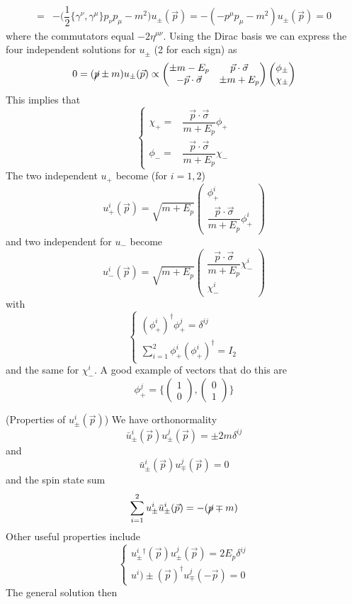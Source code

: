 \begin{defi}
\[\begin{align*}
=&-\Big(\dfrac{1}{2}\{\gamma ^{\nu },\gamma ^{\mu }\}p_{\nu }p_{\mu }-m^2\Big)u_{\pm}(\vec{p})=-(-p^{\mu }p_{\mu }-m^2)u_{\pm}(\vec{p})=0
\end{align*}\]
where the commutators equal $-2\eta ^{\mu \nu }$. Using the Dirac basis we can express the four independent solutions for $u_{\pm}$ (2 for each sign) as
\[0=(\cancel{p}\pm m)u_{\pm}(\vec{p})\propto \begin{pmatrix}
	\pm m-E_{p}&\vec{p}\cdot \vec{\sigma }\\
	-\vec{p}\cdot \vec{\sigma }&\pm m+E_{p}
\end{pmatrix}\begin{pmatrix}
\phi _{\pm}\\\chi _{\pm}
\end{pmatrix}

\]
This implies that
\[\begin{cases}
	\chi _{+}=&\dfrac{\vec{p}\cdot \vec{\sigma }}{m+E_{p}}\phi _{+}\\
	\phi _{-}=&\dfrac{\vec{p}\cdot \vec{\sigma }}{m+E_{p}}\chi _{-}
\end{cases}\]
The two independent $u_{+}$ become (for $i=1,2$)
\[u^{i}_{+}(\vec{p})=\sqrt{m+E_{p}}\begin{pmatrix}
\phi _{+}^{i}\\
\dfrac{\vec{p}\cdot \vec{\sigma }}{m+E_{p}}\phi _{+}^{i}
\end{pmatrix}
\]
and two independent for $u_{-}$ become
\[u_{-}^{i}(\vec{p})=\sqrt{m+E_{p}}\begin{pmatrix}
\dfrac{\vec{p}\cdot \vec{\sigma }}{m+E_{p}}\chi _{-}^{i}\\
\chi _{-}^{i}
\end{pmatrix}
\]
with
\[\begin{cases}
	(\phi _{+}^{i})^{\dagger}\phi _{+}^{j}=\delta ^{ij}\\
	\sum ^{2}_{i=1}\phi _{+}^{i}(\phi _{+}^{i})^{\dagger}=I_{2}
\end{cases}\]
and the same for $\chi _{-}^{i}$. A good example of vectors that do this are
\[\phi _{+}^{j}=\{\begin{pmatrix}
1\\0
\end{pmatrix},\begin{pmatrix}
0\\1
\end{pmatrix}
\}\]
\end{defi}
\vspace{2ex}
\begin{rmk}
(Properties of $u_{\pm}^{i}(\vec{p})$) We have orthonormality
\[\bar{u}_{\pm}^{i}(\vec{p})u^{j}_{\pm}(\vec{p})=\pm 2m \delta ^{ij}\]
and 
\[\bar{u}^{i}_{\pm}(\vec{p})u_{\mp}^{j}(\vec{p})=0\]
and the spin state sum
\[\sum ^{2}_{i=1}u_{\pm}^{i}\bar{u}^{i}_{\pm}(\vec{p})=-(\cancel{p}\mp m)\]
Other useful properties include
\[\begin{cases}
u^{i}_{\pm}^{\dagger}(\vec{p})u^{j}_{\pm}(\vec{p})=2E_{p}\delta ^{ij}\\
u^{i})\pm(\vec{p})^{\dagger}u_{\mp}^{j}(-\vec{p})=0
\end{cases}\]
The general solution then 
\end{rmk}
\vspace{2ex}
